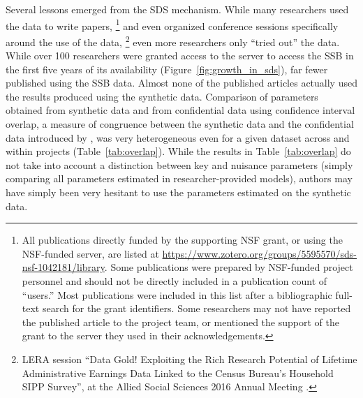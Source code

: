 \documentclass[]{hdsr}
\begin{document}
Several lessons emerged from the SDS mechanism. While many researchers used the data to write papers,
%
\footnote{All publications directly funded by the supporting NSF grant, or using the NSF-funded server, are listed at \url{https://www.zotero.org/groups/5595570/sds-nsf-1042181/library}. Some publications were prepared by NSF-funded project personnel and should not be directly included in a publication count of ``users.'' Most publications were included in this list after a bibliographic full-text search for the grant identifiers. Some researchers may not have reported the published article to the project team, or mentioned the support of the grant to the server they used in their acknowledgements.} 
%
and even organized conference sessions specifically around the use of the data,
%
\footnote{LERA session ``Data Gold! Exploiting the Rich Research Potential of Lifetime
Administrative Earnings Data Linked to the Census Bureau’s
Household SIPP Survey'',  at the Allied Social Sciences 2016 Annual Meeting \citep{american_economic_association_allied_2016}. }
%
even more researchers only ``tried out'' the data. While over 100 researchers were granted access to the server to access the \ac{SSB} in the first five years of its availability (Figure~\ref{fig:growth_in_sds}), far fewer published using the \ac{SSB} data. Almost none of the published articles actually used the results produced using the synthetic data. Comparison of parameters obtained from synthetic data and from confidential data using confidence interval overlap, a measure of congruence between the synthetic data and the confidential data introduced by \citet{tas2006}, was very heterogeneous even for a given dataset across and within projects (Table~\ref{tab:overlap}). While the results in Table~\ref{tab:overlap} do not take into account a distinction between key and nuisance parameters (simply comparing all parameters estimated in researcher-provided models), authors may have simply been very hesitant to use the parameters estimated on the synthetic data.
\end{document}
